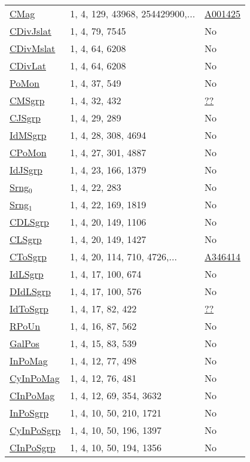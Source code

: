 {\begin{tabular}{|l|l|l|}
\hyperlink{CMag}{CMag}& 1, 4, 129, 43968, 254429900,... &\href{http://oeis.org/A001425}{A001425}\\
\hyperlink{CDivJslat}{CDivJslat}& 1, 4, 79, 7545 &No\\
\hyperlink{CDivMslat}{CDivMslat}& 1, 4, 64, 6208 &No\\
\hyperlink{CDivLat}{CDivLat}& 1, 4, 64, 6208 &No\\
\hyperlink{PoMon}{PoMon}& 1, 4, 37, 549 &No\\
\hyperlink{CMSgrp}{CMSgrp}& 1, 4, 32, 432 &\href{http://oeis.org/A009668}{??}\\
\hyperlink{CJSgrp}{CJSgrp}& 1, 4, 29, 289 &No\\
\hyperlink{IdMSgrp}{IdMSgrp}& 1, 4, 28, 308, 4694 &No\\
\hyperlink{CPoMon}{CPoMon}& 1, 4, 27, 301, 4887 &No\\
\hyperlink{IdJSgrp}{IdJSgrp}& 1, 4, 23, 166, 1379 &No\\
\hyperlink{Srng$_0$}{Srng$_0$}& 1, 4, 22, 283 &No\\
\hyperlink{Srng$_1$}{Srng$_1$}& 1, 4, 22, 169, 1819 &No\\
\hyperlink{CDLSgrp}{CDLSgrp}& 1, 4, 20, 149, 1106 &No\\
\hyperlink{CLSgrp}{CLSgrp}& 1, 4, 20, 149, 1427 &No\\
\hyperlink{CToSgrp}{CToSgrp}& 1, 4, 20, 114, 710, 4726,... &\href{http://oeis.org/A346414}{A346414}\\
\hyperlink{IdLSgrp}{IdLSgrp}& 1, 4, 17, 100, 674 &No\\
\hyperlink{DIdLSgrp}{DIdLSgrp}& 1, 4, 17, 100, 576 &No\\
\hyperlink{IdToSgrp}{IdToSgrp}& 1, 4, 17, 82, 422 &\href{http://oeis.org/A181517}{??}\\
\hyperlink{RPoUn}{RPoUn}& 1, 4, 16, 87, 562 &No\\
\hyperlink{GalPos}{GalPos}& 1, 4, 15, 83, 539 &No\\
\hyperlink{InPoMag}{InPoMag}& 1, 4, 12, 77, 498 &No\\
\hyperlink{CyInPoMag}{CyInPoMag}& 1, 4, 12, 76, 481 &No\\
\hyperlink{CInPoMag}{CInPoMag}& 1, 4, 12, 69, 354, 3632 &No\\
\hyperlink{InPoSgrp}{InPoSgrp}& 1, 4, 10, 50, 210, 1721 &No\\
\hyperlink{CyInPoSgrp}{CyInPoSgrp}& 1, 4, 10, 50, 196, 1397 &No\\
\hyperlink{CInPoSgrp}{CInPoSgrp}& 1, 4, 10, 50, 194, 1356 &No\\

\end{tabular}}
